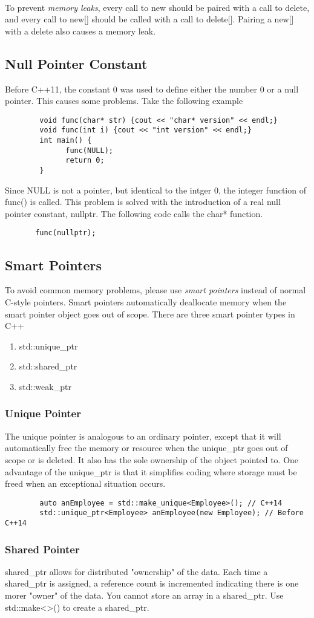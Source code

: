 \documentclass{article}
\begin{document}
\noindent \\ To prevent \textit{memory leaks}, every call to new should be paired with a call to
delete, and every call to new[] should be called with a call to delete[]. Pairing a new[] with a
delete also causes a memory leak.

\subsection{Null Pointer Constant}
Before C++11, the constant 0 was used to define either the number 0 or a null pointer. This causes
some problems. Take the following example
\begin{verbatim}
        void func(char* str) {cout << "char* version" << endl;}
        void func(int i) {cout << "int version" << endl;}
        int main() {
              func(NULL);
              return 0;
        }
\end{verbatim}
Since NULL is not a pointer, but identical to the intger 0, the integer function of func() is called.
This problem is solved with the introduction of a real null pointer constant, nullptr. The
following code calls the char* function.
\begin{verbatim}
       func(nullptr);
\end{verbatim}
\subsection{Smart Pointers}
To avoid common memory problems, please use \textit{smart pointers} instead of normal C-style
pointers. Smart pointers automatically deallocate memory when the smart pointer object goes out
of scope.
There are three smart pointer types in C++
\begin{enumerate}
	\item std::unique\_ptr
	\item std::shared\_ptr
	\item std::weak\_ptr
\end{enumerate}
\subsubsection{Unique Pointer}
The unique pointer is analogous to an ordinary pointer, except that it will automatically free the
memory or resource when the unique\_ptr goes out of scope or is deleted. It also has the sole ownership
of the object pointed to. One advantage of the unique\_ptr is that it simplifies coding where
storage must be freed when an exceptional situation occurs.
\begin{verbatim}
        auto anEmployee = std::make_unique<Employee>(); // C++14
        std::unique_ptr<Employee> anEmployee(new Employee); // Before C++14
\end{verbatim}
\subsubsection{Shared Pointer}
shared\_ptr allows for distributed "ownership" of the data. Each time a shared\_ptr is assigned,
a reference count is incremented indicating there is one morer "owner" of the data. You cannot
store an array in a shared\_ptr. Use std::make<>() to create a shared\_ptr.
\end{document}
